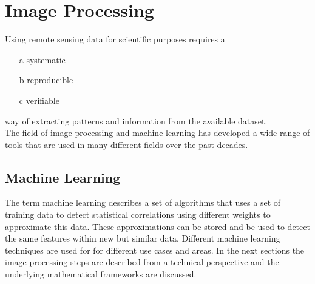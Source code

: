 \documentclass[12pt,a4paper, english,twoside]{scrartcl}
\begin{document}
\section{Image Processing}\label{sec:imgProcessing}
    Using remote sensing data for scientific purposes requires a 
    \begin{itemize} 
      \item[a] systematic
      \item[b] reproducible
      \item[c] verifiable 
    \end{itemize}%
    way of extracting patterns and information from the available dataset.\\
    The field of image processing and machine learning has developed a wide range of tools that are used in many different fields over the past decades. 

    \subsection{Machine Learning}\label{sec:ml}
    The term machine learning describes a set of algorithms that uses a set of training data to detect statistical correlations using different weights to approximate this data.
      These approximations can be stored and be used to detect the same features within new but similar data.
      Different machine learning techniques are used for for different use cases and areas.
      In the next sections the image processing steps are described from a technical perspective and the underlying mathematical frameworks are discussed.
%
\end{document}

